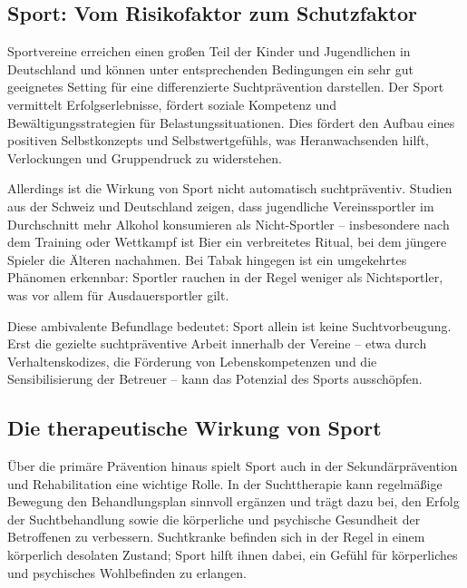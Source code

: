 \documentclass[11pt,a4paper]{article}
\begin{document}
	\subsection{Sport: Vom Risikofaktor zum Schutzfaktor}
	
	Sportvereine erreichen einen großen Teil der Kinder und Jugendlichen in Deutschland und können unter entsprechenden Bedingungen ein sehr gut geeignetes Setting für eine differenzierte Suchtprävention darstellen\cite{dosb-sport-prevention}. Der Sport vermittelt Erfolgserlebnisse, fördert soziale Kompetenz und Bewältigungsstrategien für Belastungssituationen. Dies fördert den Aufbau eines positiven Selbstkonzepts und Selbstwertgefühls, was Heranwachsenden hilft, Verlockungen und Gruppendruck zu widerstehen\cite{dosb-sport-prevention}.
	
	Allerdings ist die Wirkung von Sport nicht automatisch suchtpräventiv. Studien aus der Schweiz und Deutschland zeigen, dass jugendliche Vereinssportler im Durchschnitt mehr Alkohol konsumieren als Nicht-Sportler – insbesondere nach dem Training oder Wettkampf ist Bier ein verbreitetes Ritual, bei dem jüngere Spieler die Älteren nachahmen\cite{sport-prevention-risks}. Bei Tabak hingegen ist ein umgekehrtes Phänomen erkennbar: Sportler rauchen in der Regel weniger als Nichtsportler, was vor allem für Ausdauersportler gilt\cite{sport-prevention-risks}.
	
	Diese ambivalente Befundlage bedeutet: Sport allein ist keine Suchtvorbeugung\cite{sport-instead-of-addiction}. Erst die gezielte suchtpräventive Arbeit innerhalb der Vereine – etwa durch Verhaltenskodizes, die Förderung von Lebenskompetenzen und die Sensibilisierung der Betreuer – kann das Potenzial des Sports ausschöpfen.
	
	\subsection{Die therapeutische Wirkung von Sport}
	
	Über die primäre Prävention hinaus spielt Sport auch in der Sekundärprävention und Rehabilitation eine wichtige Rolle. In der Suchttherapie kann regelmäßige Bewegung den Behandlungsplan sinnvoll ergänzen und trägt dazu bei, den Erfolg der Suchtbehandlung sowie die körperliche und psychische Gesundheit der Betroffenen zu verbessern\cite{sport-therapy}. Suchtkranke befinden sich in der Regel in einem körperlich desolaten Zustand; Sport hilft ihnen dabei, ein Gefühl für körperliches und psychisches Wohlbefinden zu erlangen\cite{dosb-sport-prevention}.
	
\end{document}
